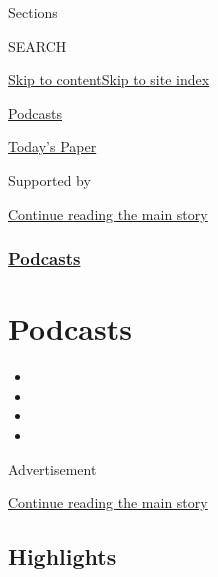 Sections

SEARCH

\protect\hyperlink{site-content}{Skip to
content}\protect\hyperlink{site-index}{Skip to site index}

\href{https://www.nytimes.com/spotlight/podcasts}{Podcasts}

\href{https://myaccount.nytimes.com/auth/login?response_type=cookie\&client_id=vi}{}

\href{https://www.nytimes.com/section/todayspaper}{Today's Paper}

Supported by

\protect\hyperlink{after-sponsor}{Continue reading the main story}

\hypertarget{podcasts}{%
\subsubsection{\texorpdfstring{\href{/spotlight/podcasts}{Podcasts}}{Podcasts}}\label{podcasts}}

\hypertarget{podcasts-1}{%
\section{Podcasts}\label{podcasts-1}}

\begin{itemize}
\item
\item
\item
\item
\end{itemize}

Advertisement

\protect\hyperlink{after-subheader}{Continue reading the main story}

\hypertarget{highlights}{%
\subsection{Highlights}\label{highlights}}

